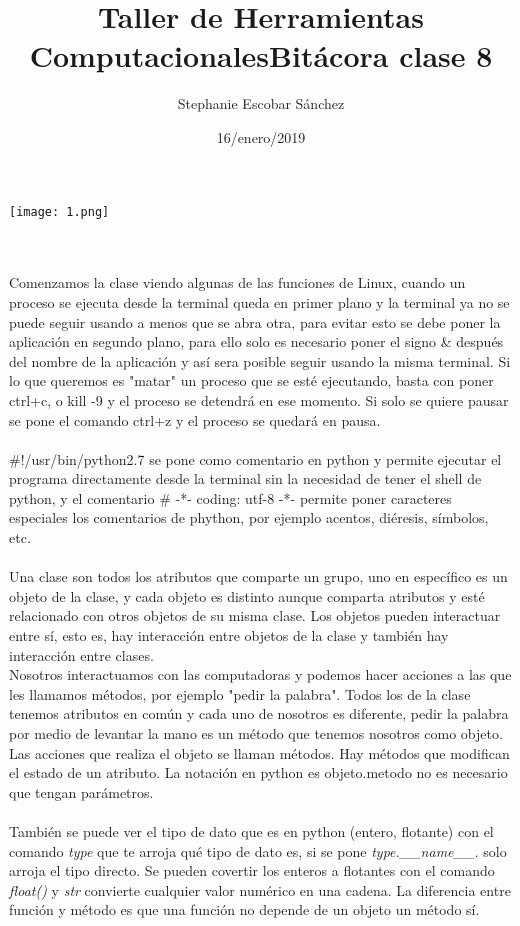 \documentclass{article}
\title{\Huge Taller de Herramientas Computacionales}
\author{Stephanie Escobar Sánchez}
\date{16/enero/2019}
\begin{document}
	\maketitle
\begin{center}
	\texttt{[image: 1.png]}	
\end{center}
\newpage
\title{\Huge Bitácora clase 8} \\
\\
Comenzamos la clase viendo algunas de las funciones de Linux, cuando un proceso se ejecuta desde la terminal queda en primer plano y la terminal ya no se puede seguir usando a menos que se abra otra, para evitar esto se debe poner la aplicación en segundo plano, para ello solo es necesario poner el signo \& después del nombre de la aplicación y así sera posible seguir usando la misma terminal. Si lo que queremos es "matar" un proceso que se esté ejecutando, basta con poner ctrl+c, o kill -9 y el proceso se detendrá en ese momento. Si solo se quiere pausar se pone el comando ctrl+z y el proceso se quedará en pausa. \\
\\
\#!/usr/bin/python2.7 se pone como comentario en python y permite ejecutar el programa directamente desde la terminal sin la necesidad de tener el shell de python, y el comentario \# -*- coding: utf-8 -*- permite poner caracteres especiales los comentarios de phython, por ejemplo acentos, diéresis, símbolos, etc.\\
\\
Una clase son todos los atributos que comparte un grupo, uno en específico es un objeto de la clase, y cada objeto es distinto aunque comparta atributos y esté relacionado con otros objetos de su misma clase. Los objetos pueden interactuar entre sí, esto es, hay interacción entre objetos de la clase y también hay interacción entre clases.\\
Nosotros interactuamos con las computadoras y podemos hacer acciones a las que les llamamos métodos, por ejemplo "pedir la palabra". Todos los de la clase tenemos atributos en común y cada uno de nosotros es diferente, pedir la palabra por medio de levantar la mano es un método que tenemos nosotros como objeto. Las acciones que realiza el objeto se llaman métodos. Hay métodos que modifican el estado de un atributo.
La notación en python es objeto.metodo no es necesario que tengan parámetros.\\
\\
También se puede ver el tipo de dato que es en python (entero, flotante) con el comando \textit{type} que te arroja qué tipo de dato es, si se pone \textit{type.\_\_name\_\_.} solo arroja el tipo directo. Se pueden covertir los enteros a flotantes con el comando \textit{float()} y  \textit{str} convierte cualquier valor numérico en una cadena. La diferencia entre función y método es que una función no depende de un objeto un método sí.\\
\end{document}
